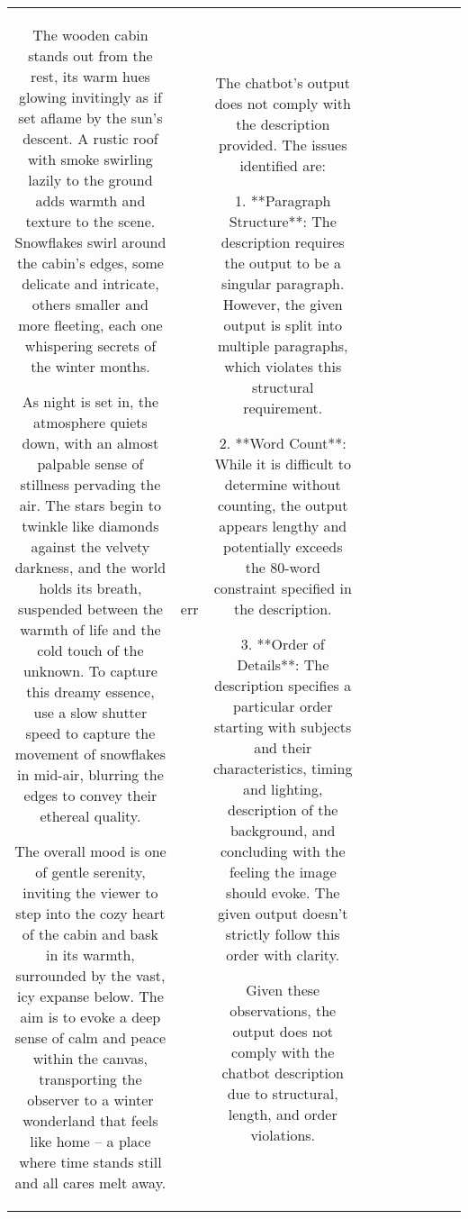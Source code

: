 \begin{table}[h!]
\begin{tabular}{|c|c|c|c|c|c|c|c|c|c|}
The wooden cabin stands out from the rest, its warm hues glowing invitingly as if set aflame by the sun's descent. A rustic roof with smoke swirling lazily to the ground adds warmth and texture to the scene. Snowflakes swirl around the cabin's edges, some delicate and intricate, others smaller and more fleeting, each one whispering secrets of the winter months.

As night is set in, the atmosphere quiets down, with an almost palpable sense of stillness pervading the air. The stars begin to twinkle like diamonds against the velvety darkness, and the world holds its breath, suspended between the warmth of life and the cold touch of the unknown. To capture this dreamy essence, use a slow shutter speed to capture the movement of snowflakes in mid-air, blurring the edges to convey their ethereal quality.

The overall mood is one of gentle serenity, inviting the viewer to step into the cozy heart of the cabin and bask in its warmth, surrounded by the vast, icy expanse below. The aim is to evoke a deep sense of calm and peace within the canvas, transporting the observer to a winter wonderland that feels like home – a place where time stands still and all cares melt away. & err & The chatbot's output does not comply with the description provided. The issues identified are:

1. **Paragraph Structure**: The description requires the output to be a singular paragraph. However, the given output is split into multiple paragraphs, which violates this structural requirement.

2. **Word Count**: While it is difficult to determine without counting, the output appears lengthy and potentially exceeds the 80-word constraint specified in the description.

3. **Order of Details**: The description specifies a particular order starting with subjects and their characteristics, timing and lighting, description of the background, and concluding with the feeling the image should evoke. The given output doesn't strictly follow this order with clarity.

Given these observations, the output does not comply with the chatbot description due to structural, length, and order violations.


\end{tabular}
\end{table}
